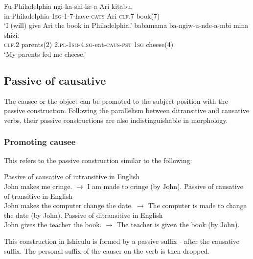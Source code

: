 \begin{exe}
\ex
\gll Fu-Philadelphia ngi-ka-shi-ke-\textipa{\textbeltl}a Ari  kitabu. \\
in-Philadelphia \textsc{1sg}-\textsc{1}-\textsc{7}-have-\textsc{caus} Ari \textsc{clf}.7 book(7) \\
\trans `I (will) give Ari the book in Philadelphia.'
\ex
{} babamama ba-ngiw-u-nde-\textipa{\textbeltl}a-mbi mina shizi. \\
\textsc{clf.2} parents(2) \textsc{2.pl}-\textsc{1sg}-\textsc{4.sg}-eat-\textsc{caus}-\textsc{pst} \textsc{1sg} cheese(4) \\
\trans `My parents fed me cheese.'
\end{exe}

\subsection{Passive of causative}

The causee or the object can be promoted to the subject position with the passive construction. Following the parallelism between ditransitive and causative verbs, their passive constructions are also indistinguishable in morphology.

\subsubsection{Promoting causee}

This refers to the passive construction similar to the following:

\begin{exe}
\ex Passive of causative of intransitive in English \\
John makes me cringe. $\rightarrow$ I am made to cringe (by John).
\ex Passive of causative of transitive in English \\
John makes the computer change the date. $\rightarrow$ The computer is made to change the date (by John).
\ex Passive of ditransitive in English \\
John gives the teacher the book. $\rightarrow$ The teacher is given the book (by John).
\end{exe}

This construction in Ishiculu is formed by a passive suffix \textit{-} after the causative suffix. The personal suffix of the causer on the verb is then dropped.


